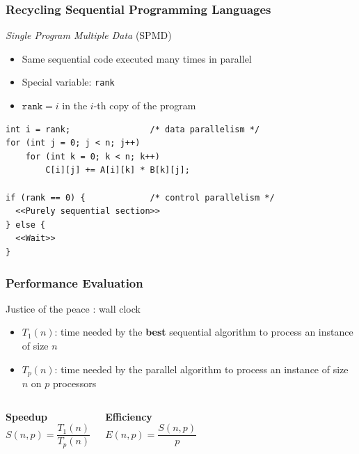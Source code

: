\documentclass[xcolor={x11names,svgnames,psnames}]{beamer}
\begin{document}
\begin{frame}[fragile]
  \frametitle{Recycling Sequential Programming Languages}


  \begin{block}{\emph{Single Program Multiple Data} (SPMD)}
    \begin{itemize}
    \item Same sequential code executed many times in parallel
    \item Special variable: \texttt{rank}
    \item $\texttt{rank} = i$ in the $i$-th copy of the program
    \end{itemize}
  \end{block}

  \medskip
  
  \begin{verbatim}
int i = rank;                /* data parallelism */
for (int j = 0; j < n; j++)
    for (int k = 0; k < n; k++)
        C[i][j] += A[i][k] * B[k][j];

if (rank == 0) {             /* control parallelism */
  <<Purely sequential section>>
} else {
  <<Wait>>
}
\end{verbatim}
\end{frame}


\begin{frame}
\frametitle{Performance Evaluation}

Justice of the peace : \alert{wall clock}

\medskip

\begin{itemize}
\item $T_1(n)$: time needed by the \textbf{best} sequential algorithm
  to process an instance of size $n$

  \medskip
  
\item $T_p(n)$: time needed by the parallel algorithm   to process an instance of size $n$ on $p$ processors
\end{itemize}

\vspace*{-0.5cm}
\begin{columns}[t]

\begin{block}{\textbf{Speedup}}
  \[
    S(n,p)  =  \frac{T_1(n)}{T_p(n)}
  \]
\end{block}

\begin{block}{\textbf{Efficiency}}
  \[
    E(n,p)  = \frac{S(n,p)}{p}
  \]
\end{block}
\end{columns}
\end{frame}
\end{document}
